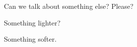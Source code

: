 \label{ally:13}
\begin{paracol}{2}
  \begin{leftcolumn}

\null
\vfill
\noindent Can we talk about something else? Please?

\begin{ally}
Something lighter?
\end{ally}
Something softer.
\vfill
\newpage

\end{leftcolumn}
\end{paracol}
